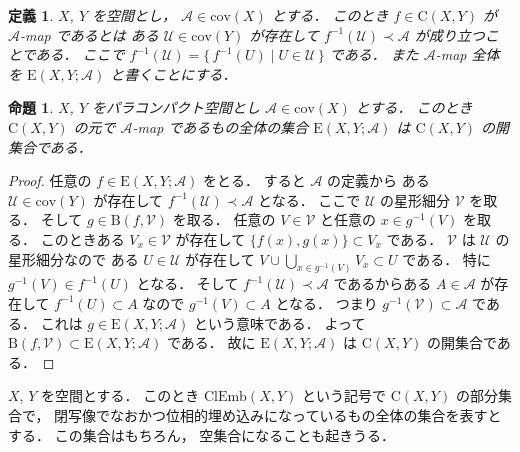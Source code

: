 \documentclass[leqno, a4paper, 12pt]{jsarticle}
\numberwithin{equation}{section}
\newtheorem{prop}[thm]{命題}
\newtheorem{df}[thm]{定義}
\newcommand{\yocov}[1]{\mathrm{cov}(#1)}
\newcommand{\yocovfont}[1]{\mathscr{#1}}
\newcommand{\yofine}{\prec}
\newcommand{\yomapl}[2]{\mathrm{C}(#1, #2)}
\newcommand{\yonbset}[2]{\mathrm{B}(#1, #2)}
\newcommand{\yoemb}[2]{\mathrm{ClEmb}(#1, #2)}
\newcommand{\yocmaps}[3]{\mathrm{E}(#1, #2; #3)}
\begin{document}
\begin{df}
$X$, 
$Y$
を空間とし，
$\yocovfont{A}\in \yocov{X}$
とする．
このとき
$f\in \yomapl{X}{Y}$
が
$\yocovfont{A}$-map
であるとは
ある
$\yocovfont{U}\in \yocov{Y}$
が存在して
$f^{-1}(\yocovfont{U})\yofine \yocovfont{A}$
が成り立つことである．
ここで
$f^{-1}(\yocovfont{U})=\{\, f^{-1}(U)\mid U\in \yocovfont{U}\, \}$
である．
また
$\yocovfont{A}$-map
全体を
$\yocmaps{X}{Y}{\yocovfont{A}}$
と書くことにする．
\end{df}


\begin{prop}\label{prop:amaps}
$X$, 
$Y$
をパラコンパクト空間とし
$\yocovfont{A}\in \yocov{X}$
とする．
このとき
$\yomapl{X}{Y}$
の元で
$\yocovfont{A}$-map
であるもの全体の集合
$\yocmaps{X}{Y}{\yocovfont{A}}$
は
$\yomapl{X}{Y}$
の開集合である．
\end{prop}
\begin{proof}
任意の
$f\in \yocmaps{X}{Y}{\yocovfont{A}}$
をとる．
すると
$\yocovfont{A}$
の定義から
ある
$\yocovfont{U}\in \yocov{Y}$
が存在して
$f^{-1}(\yocovfont{U})\yofine \yocovfont{A}$
となる．
ここで
$\yocovfont{U}$
の星形細分
$\yocovfont{V}$
を取る．
そして
$g\in \yonbset{f}{\yocovfont{V}}$
を取る．
任意の
$V\in \yocovfont{V}$
と任意の
$x\in g^{-1}(V)$
を取る．
このときある
$V_{x}\in \yocovfont{V}$
が存在して
$\{f(x), g(x)\}\subset V_{x}$
である．
$\yocovfont{V}$
は
$\yocovfont{U}$
の星形細分なので
ある
$U\in \yocovfont{U}$
が存在して
$V\cup \bigcup_{x\in g^{-1}(V)}V_{x}\subset U$
である．
特に
$g^{-1}(V)\in f^{-1}(U)$
となる．
そして
$f^{-1}(\yocovfont{U})\yofine \yocovfont{A}$
であるからある
$A\in \yocovfont{A}$
が存在して
$f^{-1}(U)\subset A$
なので
$g^{-1}(V)\subset A$
となる．
つまり
$g^{-1}(\yocovfont{V})\subset \yocovfont{A}$
である．
これは
$g\in \yocmaps{X}{Y}{\yocovfont{A}}$
という意味である．
よって
$\yonbset{f}{\yocovfont{V}}\subset \yocmaps{X}{Y}{\yocovfont{A}}$
である．
故に
$\yocmaps{X}{Y}{\yocovfont{A}}$
は
$\yomapl{X}{Y}$
の開集合である．
\end{proof}



$X$, 
$Y$
を空間とする．
このとき
$\yoemb{X}{Y}$
という記号で
$\yomapl{X}{Y}$
の部分集合で，
閉写像でなおかつ位相的埋め込みになっているもの全体の集合を表すとする．
この集合はもちろん，
空集合になることも起きうる．
\end{document}
